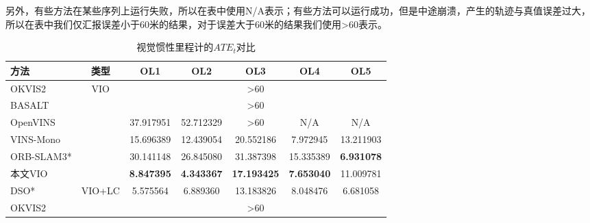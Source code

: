 另外，有些方法在某些序列上运行失败，所以在表中使用N/A表示；有些方法可以运行成功，但是中途崩溃，产生的轨迹与真值误差过大，所以在表中我们仅汇报误差小于60米的结果，对于误差大于60米的结果我们使用\textgreater{}60表示。

\begin{table}
\centering
\begin{threeparttable}
\caption{视觉惯性里程计的$ATE_t$\textdownarrow{}对比}
\begin{tabular}{lcccccc}
\toprule
方法 & 类型           & OL1 & OL2 & OL3 & OL4 & OL5 \\ \midrule
OKVIS2          & \multirow{6}{*}{VIO}    & \multicolumn{5}{c}{\textgreater{}60}                       \\
BASALT          &                         & \multicolumn{5}{c}{\textgreater{}60}                       \\
OpenVINS        &                         & 37.917951                                & 52.712329                                & {\textgreater{}60}                               & N/A                                      & N/A                                      \\
VINS-Mono       &                         & 15.696389                                & 12.439054                                &20.552186                                & 7.972945                                 & 13.211903                                \\
ORB-SLAM3*       &                         & 30.141148                                & 26.845080                                & 31.387398                                & 15.335389                                & \cellcolor[HTML]{FFCCC9}\textbf{6.931078}                                 \\
本文VIO            &                         & \cellcolor[HTML]{FFCCC9}\textbf{8.847395}                                 & \cellcolor[HTML]{FFCCC9}\textbf{4.343367}                                 &  \cellcolor[HTML]{FFCCC9}\textbf{17.193425}                                & \cellcolor[HTML]{FFCCC9}\textbf{7.653040}                                 & 11.009781                                \\ \midrule
DSO*         & \multirow{7}{*}{VIO+LC} & 5.575564                                 & 6.889360                                 & 13.183826                                & 8.048476                                 & 6.681058                                 \\
OKVIS2          &                         & \multicolumn{5}{c}{\textgreater{}60}                         \\

\end{tabular}
\end{threeparttable}
\end{table}
